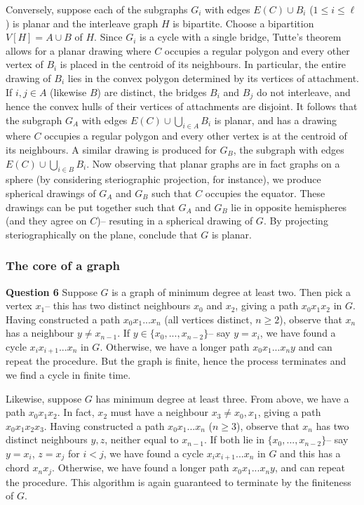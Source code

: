 \documentclass[12pt]{article}
\begin{document}
Conversely, suppose each of the subgraphs \(G_i\) with edges \(E(C)\cup B_i\)
(\(1\leq i \leq \ell\)) is planar and the interleave graph \(H\) is bipartite.
Choose a bipartition \(V[H]=A\cup B\) of \(H\). Since \(G_i\) is a cycle with a single bridge,
Tutte's theorem allows for a planar drawing where \(C\) occupies a regular
polygon and every other vertex of \(B_i\) is placed in the centroid of its
neighbours. In particular, the entire drawing of \(B_i\) lies in the convex
polygon determined by its vertices of attachment. If \(i,j\in A\) (likewise
\(B\)) are distinct, the bridges \(B_i\) and \(B_j\) do not
interleave, and hence the convex hulls of their vertices of attachments are
disjoint. It follows that the subgraph \(G_A\) with edges \(E(C)\cup \bigcup_{i\in
A}B_i\) is planar, and has a drawing where \(C\) occupies a regular polygon and
every other vertex is at the centroid of its neighbours. A similar drawing is
produced for \(G_B\), the subgraph with edges \(E(C)\cup \bigcup_{i\in B}B_i\).
Now observing that planar graphs are in fact graphs on a sphere (by considering
steriographic projection, for instance), we produce spherical drawings of
\(G_A\) and \(G_B\) such that \(C\) occupies the equator. These drawings can be
put together such that \(G_A\) and \(G_B\) lie in opposite hemispheres (and they
agree on \(C\))-- resuting in a spherical drawing of \(G\). By projecting
steriographically on the plane, conclude that \(G\) is planar.

\subsubsection{The core of a graph}
\textbf{Question 6}\quad 
Suppose \(G\) is a graph of minimum degree at least two. Then pick a vertex
\(x_1\)-- this has two distinct neighbours \(x_0\) and \(x_2\), giving a path
\(x_0x_1x_2\) in \(G\). Having constructed a path \(x_0x_1...x_n\) (all vertices
distinct, \(n\geq 2\)), observe that \(x_n\) has a neighbour \(y\neq
x_{n-1}\). If \(y\in \{x_0,...,x_{n-2}\}\)-- say \(y=x_i\), we have found a
cycle \(x_ix_{i+1}...x_n\) in \(G\). Otherwise, we have a longer path
\(x_0x_1...x_{n}y\) and can repeat the procedure. But the graph is finite, hence
the process terminates and we find a cycle in finite time. 

Likewise, suppose \(G\) has minimum degree at least three. From above, we have a
path \(x_0x_1x_2\). In fact, \(x_2\) must have a neighbour \(x_3\neq x_0,x_1\),
giving a path \(x_0x_1x_2x_3\). Having constructed a path \(x_0x_1...x_n\)
(\(n\geq 3\)), observe that \(x_n\) has two distinct neighbours \(y,z\), neither
equal to \(x_{n-1}\). If both lie in \(\{x_0,...,x_{n-2}\}\)-- say \(y=x_i\),
\(z=x_j\) for \(i<j\), we have found a cycle \(x_ix_{i+1}...x_{n}\) in \(G\) and
this has a chord \(x_nx_j\). Otherwise, we have found a longer path
\(x_0x_1...x_ny\), and can repeat the procedure. This algorithm is again
guaranteed to terminate by the finiteness of \(G\).
\end{document}

